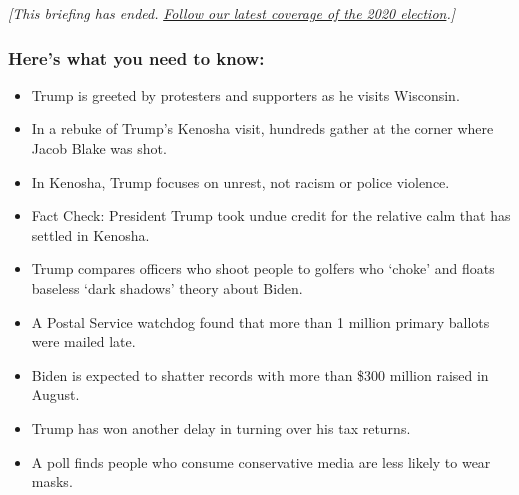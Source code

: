 \emph{{[}This briefing has ended.}
\href{https://www.nytimes3xbfgragh.onion/live/2020/09/02/us/trump-vs-biden}{\emph{Follow
our latest coverage of the 2020 election}}\emph{.{]}}

\hypertarget{heres-what-you-need-to-know}{%
\subsubsection{Here's what you need to
know:}\label{heres-what-you-need-to-know}}

\begin{itemize}
\item
  \protect\hyperlink{trump-is-greeted-by-protesters-and-supporters-as-he-visits-wisconsin}{}

  Trump is greeted by protesters and supporters as he visits Wisconsin.
\item
  \protect\hyperlink{in-a-rebuke-of-trumps-kenosha-visit-hundreds-gather-at-the-corner-where-jacob-blake-was-shot}{}

  In a rebuke of Trump's Kenosha visit, hundreds gather at the corner
  where Jacob Blake was shot.
\item
  \protect\hyperlink{in-kenosha-trump-focuses-on-unrest-not-racism-or-police-violence}{}

  In Kenosha, Trump focuses on unrest, not racism or police violence.
\item
  \protect\hyperlink{fact-check-president-trump-took-undue-credit-for-the-relative-calm-that-has-settled-in-kenosha}{}

  Fact Check: President Trump took undue credit for the relative calm
  that has settled in Kenosha.
\item
  \protect\hyperlink{trump-compares-officers-who-shoot-people-to-golfers-who-choke-and-floats-baseless-dark-shadows-theory-about-biden}{}

  Trump compares officers who shoot people to golfers who `choke' and
  floats baseless `dark shadows' theory about Biden.
\item
  \protect\hyperlink{a-postal-service-watchdog-found-that-more-than-1-million-primary-ballots-were-mailed-late}{}

  A Postal Service watchdog found that more than 1 million primary
  ballots were mailed late.
\item
  \protect\hyperlink{biden-is-expected-to-shatter-records-with-more-than-300-million-raised-in-august}{}

  Biden is expected to shatter records with more than \$300 million
  raised in August.
\item
  \protect\hyperlink{trump-has-won-another-delay-in-turning-over-his-tax-returns}{}

  Trump has won another delay in turning over his tax returns.
\item
  \protect\hyperlink{a-poll-finds-people-who-consume-conservative-media-are-less-likely-to-wear-masks}{}

  A poll finds people who consume conservative media are less likely to
  wear masks.
\end{itemize}

